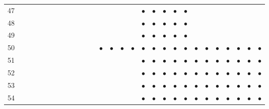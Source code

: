 \documentclass[text.tex]{subfiles}
\begin{document}
\begin{table}
{\begin{tabular}{l|ccccccccccccccccccccccccccc}
47  &           &           &           &           &           &           &           &           &           &           &           &           &           &           &           & $\bullet$ & $\bullet$ & $\bullet$ & $\bullet$ & $\bullet$ &           &           &           &           &           &           &           \\
48  &           &           &           &           &           &           &           &           &           &           &           &           &           &           &           & $\bullet$ & $\bullet$ & $\bullet$ & $\bullet$ & $\bullet$ &           &           &           &           &           &           &           \\ 
49  &           &           &           &           &           &           &           &           &           &           &           &           &           &           &           & $\bullet$ & $\bullet$ & $\bullet$ & $\bullet$ & $\bullet$ &           &           &           &           &           &           &           \\
50  &           &           &           &           &           &           &           &           &           &           &           & $\bullet$ & $\bullet$ & $\bullet$ & $\bullet$ & $\bullet$ & $\bullet$ & $\bullet$ & $\bullet$ & $\bullet$ & $\bullet$ & $\bullet$ & $\bullet$ & $\bullet$ & $\bullet$ & $\bullet$ & $\bullet$ \\ 
51  &           &           &           &           &           &           &           &           &           &           &           &           &           &           &           & $\bullet$ & $\bullet$ & $\bullet$ & $\bullet$ & $\bullet$ & $\bullet$ & $\bullet$ & $\bullet$ & $\bullet$ & $\bullet$ & $\bullet$ & $\bullet$ \\
52  &           &           &           &           &           &           &           &           &           &           &           &           &           &           &           & $\bullet$ & $\bullet$ & $\bullet$ & $\bullet$ & $\bullet$ & $\bullet$ & $\bullet$ & $\bullet$ & $\bullet$ & $\bullet$ & $\bullet$ & $\bullet$ \\
53  &           &           &           &           &           &           &           &           &           &           &           &           &           &           &           & $\bullet$ & $\bullet$ & $\bullet$ & $\bullet$ & $\bullet$ & $\bullet$ & $\bullet$ & $\bullet$ & $\bullet$ & $\bullet$ & $\bullet$ & $\bullet$ \\
54  &           &           &           &           &           &           &           &           &           &           &           &           &           &           &           & $\bullet$ & $\bullet$ & $\bullet$ & $\bullet$ & $\bullet$ & $\bullet$ & $\bullet$ & $\bullet$ & $\bullet$ & $\bullet$ & $\bullet$ & $\bullet$ \\

\end{tabular}}
\end{table}
\end{document}
